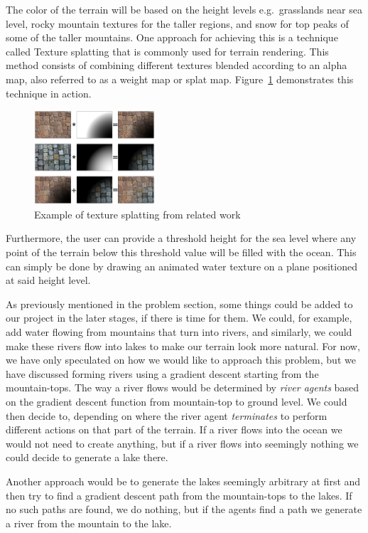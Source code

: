 The color of the terrain will be based on the height levels e.g.\ grasslands near sea level, rocky mountain textures for the taller regions, and snow for top peaks of some of the taller mountains.
One approach for achieving this is a technique called Texture splatting that is commonly used for terrain rendering.
This method consists of combining different textures blended according to an alpha map, also referred to as a weight map or splat map.
Figure~\ref{fig:texture-splatting} demonstrates this technique in action.

\begin{figure}[H]
  \centering
  \includegraphics[width=0.4\textwidth]{figure/texture-splatting.png}
  \caption{Example of texture splatting from related work \cite{wiki:texture-splatting-img}}
  \label{fig:texture-splatting}
\end{figure}

Furthermore, the user can provide a threshold height for the sea level where any point of the terrain below this threshold value will be filled with the ocean. 
This can simply be done by drawing an animated water texture on a plane positioned at said height level. 

As previously mentioned in the problem section, some things could be added to our project in the later stages, if there is time for them. 
We could, for example, add water flowing from mountains that turn into rivers, and similarly, we could make these rivers flow into lakes to make our terrain look more natural.
For now, we have only speculated on how we would like to approach this problem, but we have discussed forming rivers using a gradient descent starting from the mountain-tops.
The way a river flows would be determined by \textit{river agents} based on the gradient descent function from mountain-top to ground level. 
We could then decide to, depending on where the river agent \textit{terminates}  to perform different actions on that part of the terrain.
If a river flows into the ocean we would not need to create anything, but if a river flows into seemingly nothing we could decide to generate a lake there. 

Another approach would be to generate the lakes seemingly arbitrary at first and then try to find a gradient descent path from the mountain-tops to the lakes.
If no such paths are found, we do nothing, but if the agents find a path we generate a river from the mountain to the lake. 


